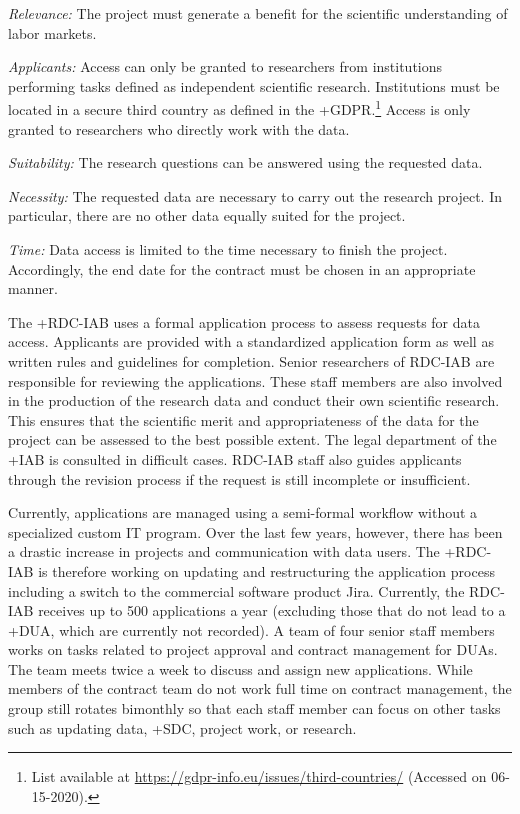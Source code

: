 \documentclass[
]{WileySix}
\begin{document}
\emph{Relevance:} The project must generate a benefit for the scientific understanding of labor markets.

\emph{Applicants:} Access can only be granted to researchers from institutions performing tasks defined as independent scientific research. Institutions must be located in a secure third country as defined in the +GDPR\textbar.\footnote{List available at \url{https://gdpr-info.eu/issues/third-countries/} (Accessed on 06-15-2020).} Access is only granted to researchers who directly work with the data.

\emph{Suitability:} The research questions can be answered using the requested data.

\emph{Necessity:} The requested data are necessary to carry out the research project. In particular, there are no other data equally suited for the project.

\emph{Time:} Data access is limited to the time necessary to finish the project. Accordingly, the end date for the contract must be chosen in an appropriate manner.

The +RDC-IAB\textbar{} uses a formal application process to assess requests for data access. Applicants are provided with a standardized application form as well as written rules and guidelines for completion. Senior researchers of RDC-IAB are responsible for reviewing the applications. These staff members are also involved in the production of the research data and conduct their own scientific research. This ensures that the scientific merit and appropriateness of the data for the project can be assessed to the best possible extent. The legal department of the +IAB\textbar{} is consulted in difficult cases. RDC-IAB staff also guides applicants through the revision process if the request is still incomplete or insufficient.

Currently, applications are managed using a semi-formal workflow without a specialized custom IT program. Over the last few years, however, there has been a drastic increase in projects and communication with data users. The +RDC-IAB\textbar{} is therefore working on updating and restructuring the application process including a switch to the commercial software product Jira. Currently, the RDC-IAB receives up to 500 applications a year (excluding those that do not lead to a +DUA\textbar, which are currently not recorded). A team of four senior staff members works on tasks related to project approval and contract management for DUAs. The team meets twice a week to discuss and assign new applications. While members of the contract team do not work full time on contract management, the group still rotates bimonthly so that each staff member can focus on other tasks such as updating data, +SDC\textbar, project work, or research.
\end{document}
